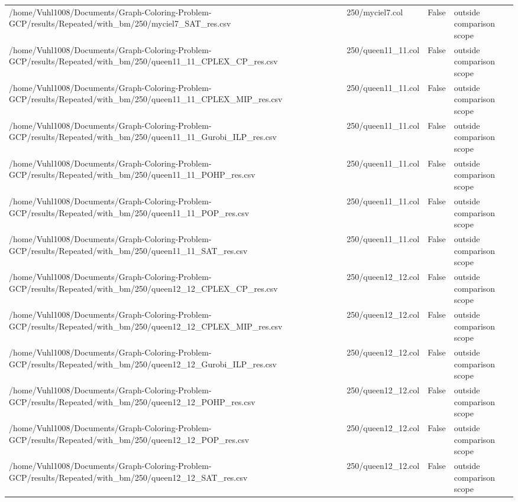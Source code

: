 \begin{table}[htbp]
\begin{tabular}{llll}
/home/Vuhl1008/Documents/Graph-Coloring-Problem-GCP/results/Repeated/with\_bm/250/myciel7\_SAT\_res.csv & 250/myciel7.col & False & outside comparison scope \\
/home/Vuhl1008/Documents/Graph-Coloring-Problem-GCP/results/Repeated/with\_bm/250/queen11\_11\_CPLEX\_CP\_res.csv & 250/queen11\_11.col & False & outside comparison scope \\
/home/Vuhl1008/Documents/Graph-Coloring-Problem-GCP/results/Repeated/with\_bm/250/queen11\_11\_CPLEX\_MIP\_res.csv & 250/queen11\_11.col & False & outside comparison scope \\
/home/Vuhl1008/Documents/Graph-Coloring-Problem-GCP/results/Repeated/with\_bm/250/queen11\_11\_Gurobi\_ILP\_res.csv & 250/queen11\_11.col & False & outside comparison scope \\
/home/Vuhl1008/Documents/Graph-Coloring-Problem-GCP/results/Repeated/with\_bm/250/queen11\_11\_POHP\_res.csv & 250/queen11\_11.col & False & outside comparison scope \\
/home/Vuhl1008/Documents/Graph-Coloring-Problem-GCP/results/Repeated/with\_bm/250/queen11\_11\_POP\_res.csv & 250/queen11\_11.col & False & outside comparison scope \\
/home/Vuhl1008/Documents/Graph-Coloring-Problem-GCP/results/Repeated/with\_bm/250/queen11\_11\_SAT\_res.csv & 250/queen11\_11.col & False & outside comparison scope \\
/home/Vuhl1008/Documents/Graph-Coloring-Problem-GCP/results/Repeated/with\_bm/250/queen12\_12\_CPLEX\_CP\_res.csv & 250/queen12\_12.col & False & outside comparison scope \\
/home/Vuhl1008/Documents/Graph-Coloring-Problem-GCP/results/Repeated/with\_bm/250/queen12\_12\_CPLEX\_MIP\_res.csv & 250/queen12\_12.col & False & outside comparison scope \\
/home/Vuhl1008/Documents/Graph-Coloring-Problem-GCP/results/Repeated/with\_bm/250/queen12\_12\_Gurobi\_ILP\_res.csv & 250/queen12\_12.col & False & outside comparison scope \\
/home/Vuhl1008/Documents/Graph-Coloring-Problem-GCP/results/Repeated/with\_bm/250/queen12\_12\_POHP\_res.csv & 250/queen12\_12.col & False & outside comparison scope \\
/home/Vuhl1008/Documents/Graph-Coloring-Problem-GCP/results/Repeated/with\_bm/250/queen12\_12\_POP\_res.csv & 250/queen12\_12.col & False & outside comparison scope \\
/home/Vuhl1008/Documents/Graph-Coloring-Problem-GCP/results/Repeated/with\_bm/250/queen12\_12\_SAT\_res.csv & 250/queen12\_12.col & False & outside comparison scope \\

\end{tabular}
\end{table}
